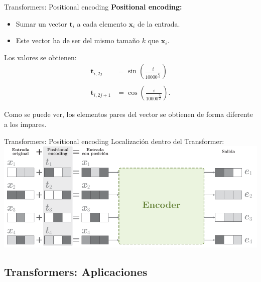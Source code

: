 \documentclass[aspectratio=169]{beamer}
\begin{document}
\begin{frame}{Transformers: Positional encoding}
  \textbf{Positional encoding:}
  \begin{itemize}
    \item Sumar un vector $\mathbf{t}_{i}$ a cada elemento $\mathbf{x}_{i}$ de la entrada.
    \item Este vector ha de ser del mismo tamaño $k$ que $\mathbf{x}_{i}$.
  \end{itemize}
  \vspace{.3cm}
  Los valores se obtienen:
  $$
  \begin{aligned}
  \mathbf{t}_{i,2j} &= \sin\left(\frac{i}{10000^{\frac{2j}{k}}}\right) \\\\
  \mathbf{t}_{i,2j+1} &= \cos\left(\frac{i}{10000^{\frac{2j}{k}}}\right).
  \end{aligned}
  $$
  \vspace{.3cm}
  \begin{block}{}
    Como se puede ver, los elementos pares del vector se obtienen de forma diferente a los impares.    
  \end{block}

\end{frame}


\begin{frame}{Transformers: Positional encoding}
  Localización dentro del Transformer:\\
  \vspace{.5cm}
  \includegraphics[width=.7\textwidth, center]{imgs/tema4/att/positional_enc.pdf}
\end{frame}

\subsection{Transformers: Aplicaciones}
\end{document}
